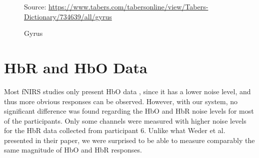 \begin{figure}[h]
  \centering
           {Source: \url{https://www.tabers.com/tabersonline/view/Tabers-Dictionary/734639/all/gyrus}}
  \caption{Gyrus}
  \label{fig:gyrus}
\end{figure}


\section{HbR and HbO Data}
Most fNIRS studies only present HbO data \citep{Ferrari2012}, since it has a lower noise level, and thus more obvious responses can be observed. However, with our system, no significant difference was found regarding the HbO and HbR noise levels for most of the participants. Only some channels were measured with higher noise levels for the HbR data collected from participant 6. Unlike what Weder et al. \citeyearpar{Weder2018} presented in their paper, we were surprised to be able to measure comparably the same magnitude of HbO and HbR responses.


